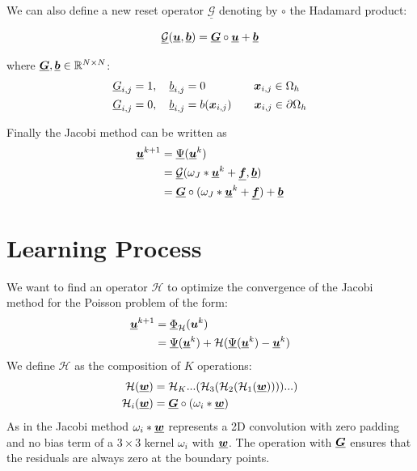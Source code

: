 We can also define a new reset operator $\underline{\mathcal{G}}$ denoting by $\circ$ the Hadamard product:

\begin{equation*}
    \underline{\mathcal{G}}(\underline{{\bm{u}}}, \underline{{\bm{b}}}) = \underline{{\bm{G}}} \circ \underline{{\bm{u}}} + \underline{{\bm{b}}}
\end{equation*}

where $\underline{{\bm{G}}},\underline{{\bm{b}}} \in {\mathbb{R}}^{N\times N}$:
\begin{align*}
    \underline{{G}}_{i,j} &= 1, \quad \underline{{b}}_{i,j} = 0 \quad \; \quad  \qquad {\bm{x}}_{i,j}\in \Omega_h \\
    \underline{{G}}_{i,j} &= 0, \quad \underline{{b}}_{i,j} = b({\bm{x}}_{i,j})  \qquad {\bm{x}}_{i,j}\in \partial\Omega_h
\end{align*}

Finally the Jacobi method can be written as 
\begin{align*}
\underline{{\bm{u}}}^{k+1} &= \underline{\Psi}(\underline{{\bm{u}}}^k)\\
                      &=\underline{\mathcal{G}}(\omega_J \ast \underline{{\bm{u}}}^k + \underline{{\bm{f}}}, \underline{{\bm{b}}})\\
                      &= \underline{{\bm{G}}}\circ(\omega_J \ast \underline{{\bm{u}}}^k + \underline{{\bm{f}}}) + \underline{{\bm{b}}}
\end{align*}

\section{Learning Process}

We want to find an operator $\mathcal{H}$ to optimize the convergence of the Jacobi method for the Poisson problem of the form:
\begin{align*}
\underline{{\bm{u}}}^{k+1} &=  \underline{\Phi}_{\mathcal{H}}({\bm{u}}^k) \\            &=\underline{\Psi}(\underline{{\bm{u}}}^k) + \mathcal{H}(\underline{\Psi}(\underline{{\bm{u}}}^k)-\underline{{\bm{u}}}^k)
\end{align*}
We define $\mathcal{H}$ as the composition of $K$ operations:
\begin{align*}
    \mathcal{H}(\underline{{\bm{w}}}) &= \mathcal{H}_K...(\mathcal{H}_3(\mathcal{H}_2(\mathcal{H}_1(\underline{{\bm{w}}}))))...)\\
    \mathcal{H}_i(\underline{{\bm{w}}}) &= \underline{{\bm{G}}} \circ (\omega_i \ast \underline{{\bm{w}}})
\end{align*}
As in the Jacobi method $\omega_i \ast \underline{{\bm{w}}}$ represents a 2D convolution with zero padding and no bias term of a $3\times3$ kernel $\omega_i$ with $\underline{{\bm{w}}}$. The operation with $\underline{{\bm{G}}}$ ensures that the residuals are always zero at the boundary points.

